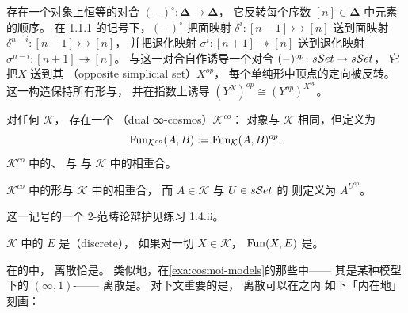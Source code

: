 \begin{definition}[\trCodualInfinityCosmos]\label{def:co-dual-cosmoi}
存在一个对象上恒等的对合\trFunctor{}
$(-)^\circ\colon\boldsymbol{\Delta}\to\boldsymbol{\Delta}$，
它反转每个序数 $[n]\in\boldsymbol{\Delta}$ 中元素的顺序。
在 1.1.1 的记号下，\trFunctor $(-)^\circ$
把面映射 $\delta^i\colon[n-1]\rightarrowtail[n]$
送到面映射 $\delta^{n-i}\colon[n-1]\rightarrowtail[n]$，
并把退化映射 $\sigma^i\colon[n+1]\twoheadrightarrow[n]$
送到退化映射 $\sigma^{n-i}\colon[n+1]\twoheadrightarrow[n]$。
与这一对合自\trIsomorphism{}作\trPreComposition{}诱导一个对合
$(-)^{op}\colon s\mathcal{S}et\to s\mathcal{S}et$，
它把\trSimplicialSet $X$ 送到其\textbf{\trOppositeSimplicialSet}
（opposite simplicial set）$X^{op}$，
每个单纯形中顶点的定向被反转。
这一构造保持所有\trCone{}形\trLimit{}与\trColimit{}，
并在指数上诱导\trIsomorphism
$(Y^X)^{op}\cong(Y^{op})^{X^{op}}$。
\end{definition}

对任何\trInfinityCosmos{} $\mathcal{K}$，
存在一个\textbf{\trDualInfinityCosmos}
（dual ∞-cosmos）$\mathcal{K}^{co}$：
对象与 $\mathcal{K}$ 相同，但\trFunctorSpace{}定义为 %
\begin{equation*}
\operatorname{Fun}_{\mathcal{K}^{co}}(A,B):=\operatorname{Fun}_{\mathcal{K}}(A,B)^{op}.
\end{equation*}
$\mathcal{K}^{co}$ 中的\trIsofibration{}、\trEquivalence{}%
与\trTrivialFibration
与 $\mathcal{K}$ 中的相重合。

$\mathcal{K}^{co}$ 中的\trCone{}形\trLimit{}与 $\mathcal{K}$ 中的相重合，
而 $A\in\mathcal{K}$ 与 $U\in s\mathcal{S}et$ 的\trCotensor %
则定义为 $A^{U^{op}}$。

这一记号的一个 2-范畴论辩护见练习 1.4.ii。

\begin{definition}[离散\trInfinityCategory]\label{def:discrete-infinity-categories}
\trInfinityCosmos{} $\mathcal{K}$ 中的\trInfinityCategory{} $E$
是\textbf{\trDiscrete}（discrete），
如果对一切 $X\in\mathcal{K}$，
\trFunctorSpace $\operatorname{Fun}(X,E)$ 是\trKanComplex{}。
\end{definition}
在\trQuasiCategory{}的\trInfinityCosmos{}中，
离散\trInfinityCategory{}恰是\trKanComplex{}。
类似地，在\cref{exa:cosmoi-models}的那些\trInfinityCosmos{}中——
其\trInfinityCategory{}是某种模型下的 $(\infty,1)$-\trCategory——
离散\trInfinityCategory{}是\trInfinityGroupoid{}。
对下文重要的是，
离散\trInfinityCategory{}可以在\trInfinityCosmos{}之内
如下「内在地」刻画：

